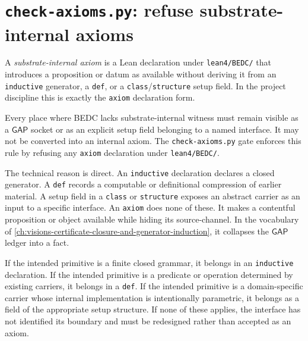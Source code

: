 \section{\texttt{check-axioms.py}: refuse substrate-internal axioms}
\label{sec:audit-gates-check-axioms}

\begin{definition}
\label{def:audit-gates-substrate-internal-axiom}
A \emph{substrate-internal axiom} is a Lean declaration under \texttt{lean4/BEDC/} that introduces a proposition or datum as available without deriving it from an \texttt{inductive} generator, a \texttt{def}, or a \texttt{class}/\texttt{structure} setup field. In the project discipline this is exactly the \texttt{axiom} declaration form.
\end{definition}

\begin{principle}
\label{prin:audit-gates-gap-not-internalized}
Every place where BEDC lacks substrate-internal witness must remain visible as a $\mathsf{GAP}$ socket or as an explicit setup field belonging to a named interface. It may not be converted into an internal axiom. The \texttt{check-axioms.py} gate enforces this rule by refusing any \texttt{axiom} declaration under \texttt{lean4/BEDC/}.
\end{principle}

The technical reason is direct. An \texttt{inductive} declaration declares a closed generator. A \texttt{def} records a computable or definitional compression of earlier material. A setup field in a \texttt{class} or \texttt{structure} exposes an abstract carrier as an input to a specific interface. An \texttt{axiom} does none of these. It makes a contentful proposition or object available while hiding its source-channel. In the vocabulary of \autoref{ch:visions-certificate-closure-and-generator-induction}, it collapses the $\mathsf{GAP}$ ledger into a fact.

\begin{example}
\label{ex:audit-gates-check-axioms-decision}
If the intended primitive is a finite closed grammar, it belongs in an \texttt{inductive} declaration. If the intended primitive is a predicate or operation determined by existing carriers, it belongs in a \texttt{def}. If the intended primitive is a domain-specific carrier whose internal implementation is intentionally parametric, it belongs as a field of the appropriate setup structure. If none of these applies, the interface has not identified its boundary and must be redesigned rather than accepted as an axiom.
\end{example}

